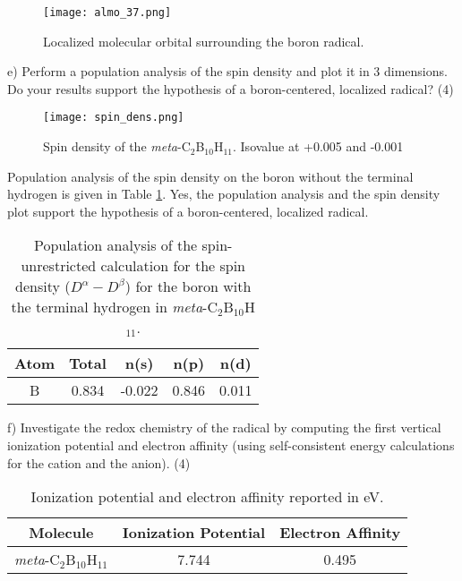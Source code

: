 \documentclass{article}
\begin{document}
\begin{figure}[H]
  \centering
  \texttt{[image: almo\_37.png]}
  \caption{Localized molecular orbital surrounding the boron radical.}
  \label{fig:almo_37}
\end{figure}

\noindent e) Perform a population analysis of the spin density and plot
it in 3 dimensions. Do your results support the hypothesis of a boron-centered,
localized radical? (4)

\begin{figure}[H]
  \centering
  \texttt{[image: spin\_dens.png]}
  \caption{Spin density of the \textit{meta}-C$_2$B$_{10}$H$_{11}$.
    Isovalue at +0.005 and -0.001}
  \label{fig:spin}
\end{figure}

{\color{blue} Population analysis of the spin density on the boron without
  the terminal hydrogen is given in Table \ref{tab:pop}. Yes, the population
  analysis and the spin density plot support the hypothesis of a boron-centered,
  localized radical.
}

\begin{table}[H]
  \centering
  \caption{Population analysis of the spin-unrestricted calculation
    for the spin density ($D^{\alpha}-D^{\beta}$) for the boron with the
    terminal hydrogen in \textit{meta}-C$_2$B$_{10}$H$_{11}$.}
  \begin{tabular}{ccccc}
    Atom & Total & n(s) & n(p) & n(d) \\
    \hline
    B & 0.834 & -0.022 & 0.846 & 0.011
  \end{tabular}
  \label{tab:pop}
\end{table}

\noindent f) Investigate the redox chemistry of the radical by computing
the first vertical ionization potential and electron affinity (using
self-consistent energy calculations for the cation and the anion). (4)
\\

\begin{table}[H]
  \centering
  \caption{Ionization potential and electron affinity
    reported in eV.}
  \begin{tabular}{ccc}
    Molecule & Ionization Potential & Electron Affinity \\
    \hline
    \textit{meta}-C$_2$B$_{10}$H$_{11}$ & 7.744 & 0.495 \\
  \end{tabular}
  \label{tab:ip_affinity}
\end{table}
\end{document}
